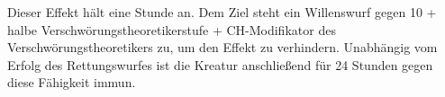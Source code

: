 \documentclass[
	ngerman,
	a4paper,
	11pt,
	twocolumn,
]{scrartcl}
\begin{document}
Dieser Effekt hält eine Stunde an. Dem Ziel steht ein Willenswurf gegen 10 + halbe Verschwörungstheoretikerstufe + CH-Modifikator des Verschwörungstheoretikers zu, um den Effekt zu verhindern. Unabhängig vom Erfolg des Rettungswurfes ist die Kreatur anschließend für 24 Stunden gegen diese Fähigkeit immun.

\end{document}
